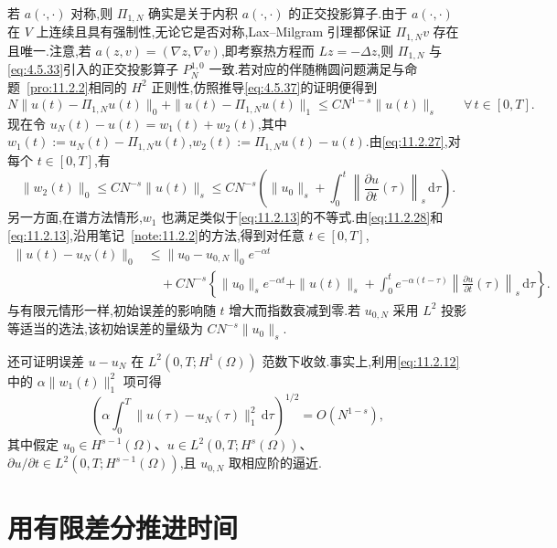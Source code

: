 若 \(a(\cdot,\cdot)\) 对称,则 \(\Pi_{1,N}\) 确实是关于内积 \(a(\cdot,\cdot)\) 的正交投影算子.由于 \(a(\cdot,\cdot)\) 在 \(V\) 上连续且具有强制性,无论它是否对称,Lax--Milgram 引理都保证 \(\Pi_{1,N}v\) 存在且唯一.注意,若 \(a(z,v)=(\nabla z,\nabla v)\),即考察热方程而 \(Lz=-\Delta z\),则 \(\Pi_{1,N}\) 与\eqref{eq:4.5.33}引入的正交投影算子 \(P_N^{1,0}\) 一致.若对应的伴随椭圆问题满足与命题~\ref{pro:11.2.2}相同的 \(H^2\) 正则性,仿照推导\eqref{eq:4.5.37}的证明便得到
\begin{equation}\label{eq:11.2.27}
  N\|u(t)-\Pi_{1,N}u(t)\|_0+\|u(t)-\Pi_{1,N}u(t)\|_1
       \le CN^{1-s}\|u(t)\|_s\qquad\forall\,t\in[0,T].
\end{equation}
现在令 \(u_N(t)-u(t)=w_1(t)+w_2(t)\),其中 \(w_1(t):=u_N(t)-\Pi_{1,N}u(t)\),\(w_2(t):=\Pi_{1,N}u(t)-u(t)\).由\eqref{eq:11.2.27},对每个 \(t\in[0,T]\),有
\begin{equation}\label{eq:11.2.28}
  \|w_2(t)\|_0\le CN^{-s}\|u(t)\|_s
     \le CN^{-s}\left(\|u_0\|_s
             +\int_0^t\left\|\frac{\partial u}{\partial t}(\tau)\right\|_s\,\mathrm d\tau\right).
\end{equation}
另一方面,在谱方法情形,\(w_1\) 也满足类似于\eqref{eq:11.2.13}的不等式.由\eqref{eq:11.2.28}和\eqref{eq:11.2.13},沿用笔记~\ref{note:11.2.2}的方法,得到对任意 \(t\in[0,T]\),
\begin{equation}\label{eq:11.2.29}
  \begin{aligned}
    \|u(t)-u_N(t)\|_0
      &\le\|u_0-u_{0,N}\|_0e^{-\alpha t}\\
      &\quad+CN^{-s}\left\{\|u_0\|_se^{-\alpha t}+\|u(t)\|_s
        +\int_0^t e^{-\alpha(t-\tau)}
             \left\|\frac{\partial u}{\partial t}(\tau)\right\|_s\,\mathrm d\tau\right\}.
  \end{aligned}
\end{equation}
与有限元情形一样,初始误差的影响随 \(t\) 增大而指数衰减到零.若 \(u_{0,N}\) 采用 \(L^2\) 投影等适当的选法,该初始误差的量级为 \(CN^{-s}\|u_0\|_s\).

还可证明误差 \(u-u_N\) 在 \(L^2(0,T;H^1(\Omega))\) 范数下收敛.事实上,利用\eqref{eq:11.2.12}中的 \(\alpha\|w_1(t)\|_1^2\) 项可得
\[
  \left(\alpha\int_0^T\|u(\tau)-u_N(\tau)\|_1^2\,\mathrm d\tau\right)^{1/2}
        =O(N^{1-s}),
\]
其中假定 \(u_0\in H^{s-1}(\Omega)\)、\(u\in L^2(0,T;H^s(\Omega))\)、\(\partial u/\partial t\in L^2(0,T;H^{s-1}(\Omega))\),且 \(u_{0,N}\) 取相应阶的逼近.

\section{用有限差分推进时间}\label{sec:11.3}

